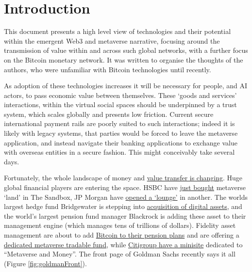 \documentclass[
	12pt, %
	fleqn, %
	a4paper, %
	oneside, %
]{LegrandOrangeBook}
\begin{document}
\section{Introduction}
This document presents a high level view of technologies and their potential within the emergent Web3 and metaverse narrative, focusing around the transmission of value within and across such global networks, with a further focus on the Bitcoin monetary network. It was written to organise the thoughts of the authors, who were unfamiliar with Bitcoin technologies until recently.\par
As adoption of these technologies increases it will be necessary for people, and AI actors, to pass economic value between themselves. These `goods and services' interactions, within the virtual social spaces should be underpinned by a trust system, which scales globally and presents low friction. Current secure international payment rails are poorly suited to such interactions; indeed it is likely with legacy systems, that parties would be forced to leave the metaverse application, and instead navigate their banking applications to exchange value with overseas entities in a secure fashion. This might conceivably take several days.\par 
Fortunately, the whole landscape of money and \href{https://www.omfif.org/futureofpayments2021/}{value transfer is changing}. Huge global financial players are entering the space. HSBC have \href{https://sandboxgame.medium.com/hsbc-to-become-the-first-global-financial-services-provider-to-enter-the-sandbox-c066e4f48163}{just bought} metaverse `land' in The Sandbox, JP Morgan have \href{https://www.forbes.com/sites/ronshevlin/2022/02/16/jpmorgan-opens-a-bank-branch-in-the-metaverse-but-its-not-for-what-you-think-its-for/?sh=2fbd1e90158d}{opened a `lounge'} in another. The worlds largest hedge fund Bridgewater is stepping into \href{https://uk.finance.yahoo.com/news/bitcoin-latest-price-crypto-ray-dalio-bridgewater-investment-fund-ethereum-094946686.html}{acquisition of digital assets}, and the world's largest pension fund manager Blackrock is adding these asset to their management engine (which manages tens of trillions of dollars). Fidelity asset management are about to add \href{https://www.wsj.com/articles/fidelity-to-allow-retirement-savers-to-put-bitcoin-in-401-k-accounts-11650945661}{Bitcoin to their pension plans} and are offering a \href{}{dedicated metaverse tradable fund}, while \href{https://www.citivelocity.com/citigps/metaverse-and-money/}{Citigroup have a minisite} dedicated to ``Metaverse and Money''. The front page of Goldman Sachs recently says it all (Figure \ref{fig:goldmanFront}).\par
\end{document}
